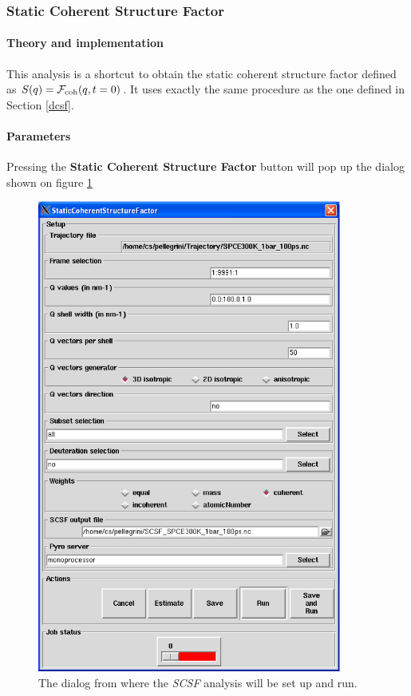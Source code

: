 \documentclass[a4paper,11pt]{report}
\begin{document}
\subsubsection{Static Coherent Structure Factor}
\label{scsf}
\paragraph{Theory and implementation\\}
\label{scsf_theory}
This analysis is a shortcut to obtain the static coherent structure factor defined as 
$S(q) = {\cal F}_{\mathrm{coh}}(q, t = 0)$. It uses exactly the same procedure as the one defined in Section \ref{dcsf}.

\paragraph{Parameters\\}
\label{scsf_parameters}
Pressing the \textbf{Static Coherent Structure Factor} button will pop up the dialog shown on figure \ref{fig:scsf}
\begin{figure}[h!]
\begin{center}
\includegraphics[width=10cm]{Figures/scsf.eps}
\end{center}
\caption[The \textit{SCSF} analysis dialog]{The dialog from where the \textit{SCSF} analysis will be set up and run.}
\label{fig:scsf}
\end{figure}   
\end{document}
